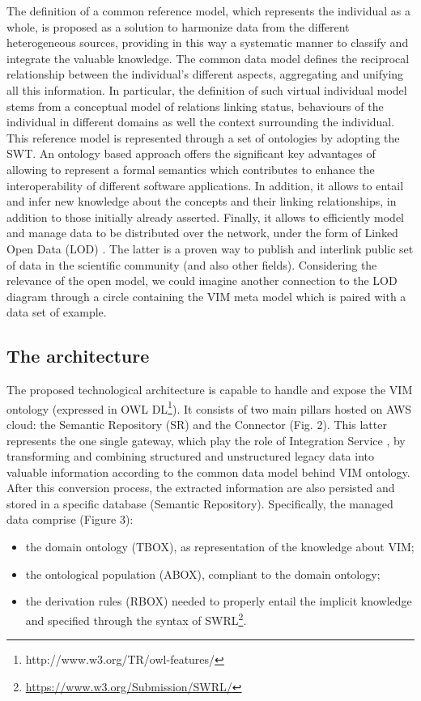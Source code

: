 \documentclass[runningheads,a4paper]{llncs}
\begin{document}
The definition of a common reference model, which represents the individual as a whole, is proposed as a solution to harmonize data from the different heterogeneous sources, providing in this way a systematic manner to classify and integrate the valuable knowledge. The common data model defines the reciprocal relationship between the individual's different aspects, aggregating and unifying all this information. In particular, the definition of such virtual individual model stems from a conceptual model of relations linking status, behaviours of the individual in different domains as well the context surrounding the individual. This reference model is represented through a set of ontologies by adopting the SWT. An ontology based approach offers the significant key advantages of allowing to represent a formal semantics which contributes to enhance the interoperability of different software applications. In addition, it allows to entail and infer new knowledge about the concepts and their linking relationships, in addition to those initially already asserted. Finally, it allows to efficiently model and manage data to be distributed over the network, under the form of Linked Open Data (LOD)  \cite{_Ref490677234}. The latter is a proven way to publish and interlink public set of data in the scientific community (and also other fields).  Considering the relevance of the open model, we could imagine another connection to the LOD diagram through a circle containing the VIM meta model which is paired with a data set of example.

\subsection{The architecture}

The proposed technological architecture is capable to handle and expose the VIM ontology (expressed in OWL DL\footnote{ http://www.w3.org/TR/owl-features/}). It consists of two main pillars hosted on AWS cloud: the Semantic Repository (SR) and the Connector (Fig. 2). This latter represents the one single gateway, which play the role of Integration Service  \cite{_Ref490677244}, by transforming and combining structured and unstructured legacy data into valuable information according to the common data model behind VIM ontology. After this conversion process, the extracted information are also persisted and stored in a specific database (Semantic Repository). Specifically, the managed data comprise (Figure 3): 
\begin{itemize}
\item the domain ontology (TBOX), as representation of the knowledge about VIM; 
\item the ontological population (ABOX), compliant to the domain ontology; 
\item the derivation rules (RBOX) needed to properly entail the implicit knowledge and specified through the syntax of SWRL\footnote{\url{https://www.w3.org/Submission/SWRL/}}.
\end{itemize}
\end{document}

